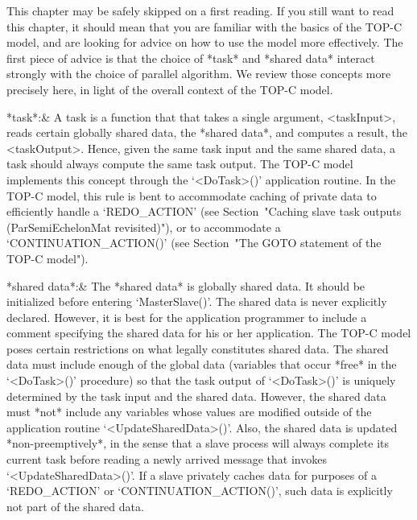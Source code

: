 

This chapter may be safely skipped on a first reading. If you still  want
to read this chapter, it should mean  that  you  are  familiar  with  the
basics of the TOP-C model, and are looking for advice on how to  use  the
model more effectively. The first piece of advice is that the  choice  of
*task* and *shared data* interact strongly with the  choice  of  parallel
algorithm. We review those concepts more precisely here, in light of  the
overall context of the TOP-C model.

\beginitems

*task*:&
    A task is a function that that takes a single argument,  <taskInput>,
    reads certain globally shared data, the *shared data*, and computes a
    result, the <taskOutput>. Hence, given the same task  input  and  the
    same shared data, a task should always compute the same task  output.
    The TOP-C model implements  this  concept  through  the  `<DoTask>()'
    application routine. In  the  TOP-C  model,  this  rule  is  bent  to
    accommodate  caching  of  private  data  to  efficiently   handle   a
    `REDO_ACTION'    (see    Section~"Caching    slave    task    outputs
    (ParSemiEchelonMat    revisited)"),    or    to     accommodate     a
    `CONTINUATION_ACTION()' (see Section~"The GOTO statement of the TOP-C
    model").

*shared data*:&
    The *shared data* is globally shared data. It should  be  initialized
    before entering `MasterSlave()'. The shared data is never  explicitly
    declared. However, it is  best  for  the  application  programmer  to
    include  a  comment  specifying  the  shared  data  for  his  or  her
    application. The TOP-C  model  poses  certain  restrictions  on  what
    legally constitutes shared data. The shared data must include  enough
    of the global data (variables that occur *free* in  the  `<DoTask>()'
    procedure) so that  the  task  output  of  `<DoTask>()'  is  uniquely
    determined by the task input and the shared data. However, the shared
    data must *not* include  any  variables  whose  values  are  modified
    outside of the application routine `<UpdateSharedData>()'. Also,  the
    shared data is updated *non-preemptively*, in the sense that a  slave
    process will always complete its current task before reading a  newly
    arrived message  that  invokes  `<UpdateSharedData>()'.  If  a  slave
    privately  caches  data  for   purposes   of   a   `REDO_ACTION'   or
    `CONTINUATION_ACTION()', such data is  explicitly  not  part  of  the
    shared data.

